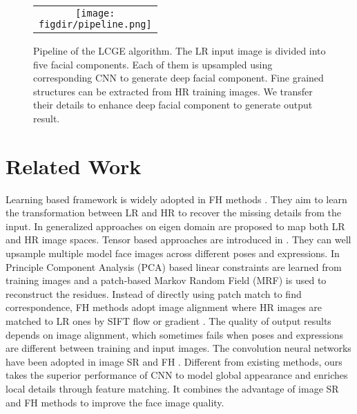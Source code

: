 \documentclass{article}
\newcommand{\figdir}{figures}
\begin{document}
\begin{figure*}[t]
\begin{center}
\begin{tabular}{c}
\texttt{[image: \\figdir/pipeline.png]}\\
\end{tabular}
\end{center}
\vspace{-7mm}
\caption{Pipeline of the LCGE algorithm. The LR input image is divided into five facial components. Each of them is upsampled using corresponding CNN to generate deep facial component. Fine grained structures can be extracted from HR training images. We transfer their details to enhance deep facial component to generate output result.}
\label{fig:pipeline}
\end{figure*}


\section{Related Work}

Learning based framework is widely adopted in FH methods \cite{wang-ijcv14-survey,song_eccv14_sketch,wang-tip17-bayesian}. They aim to learn the transformation between LR and HR to recover the missing details from the input. In \cite{gunturk-tip03-eigenface,wang-SMC05-hf} generalized approaches on eigen domain are proposed to map both LR and HR image spaces. Tensor based approaches are introduced in \cite{liu-cvpr05-hf,jia-tip08-generalized}. They can well upsample multiple model face images across different poses and expressions. In \cite{liu-ijcv07-FH} Principle Component Analysis (PCA) based linear constraints are learned from training images and a patch-based Markov Random Field (MRF) is used to reconstruct the residues. Instead of directly using patch match \cite{xiang-pr10-FH} to find correspondence, FH methods adopt image alignment where HR images are matched to LR ones by SIFT flow \cite{tappen-eccv12-bayesian} or gradient \cite{Chih-cvpr13-FH}. The quality of output results depends on image alignment, which sometimes fails when poses and expressions are different between training and input images. The convolution neural networks have been adopted in image SR \cite{chao-pami2015-srcnn,kim-cvpr16-deeply} and FH \cite{zhou-aaai15-learning,yu-eccv16-ultra}. Different from existing methods, ours takes the superior performance of CNN to model global appearance and enriches local details through feature matching. It combines the advantage of image SR and FH methods to improve the face image quality.
\end{document}
